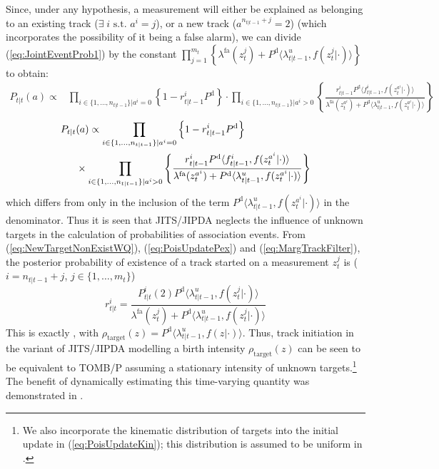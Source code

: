 \documentclass[journal,twoside]{IEEEtran}
\theoremstyle{plain}
\begin{document}
\fi
%
Since, under any hypothesis, a measurement will either be explained as belonging to an existing track ($\exists \; i \mbox{ s.t.\ } a^i=j$), or a new track ($a^{n_{t|t-1}+j}=2$) (which incorporates the possibility of it being a false alarm), we can divide (\ref{eq:JointEventProb1}) by the constant $\prod_{j=1}^{m_t}\left\{\lambda^\mathrm{fa}(z_t^j)+P^{\mathrm{d}}\langle\lambda^u_{t|t-1},f(z_t^j|\cdot)\rangle\right\}$ to obtain:
%
\ifCLASSOPTIONdraftcls
\begin{align}
P_{t|t}(a) \propto& \prod_{i\in\{1,\dots,n_{t|t-1}\}|a^i=0} \left\{ 1- r^i_{t|t-1}P^{\mathrm{d}} \right\} 
\cdot \prod_{i\in\{1,\dots,n_{t|t-1}\}|a^i>0} \left\{\frac{
r^i_{t|t-1}P^{\mathrm{d}} \langle f^i_{t|t-1},f(z_t^{a^i}|\cdot)\rangle
}{
\lambda^\mathrm{fa}(z_t^{a^i})+P^{\mathrm{d}}\langle\lambda^u_{t|t-1},f(z_t^{a^i}|\cdot)\rangle
} \right\} \label{eq:JointEventProb2}
\end{align}
\else
\begin{align}
P_{t|t}&(a) \propto \prod_{i\in\{1,\dots,n_{t|t-1}\}|a^i=0} \left\{ 1- r^i_{t|t-1}P^{\mathrm{d}} \right\} \notag\\
& \times \prod_{i\in\{1,\dots,n_{t|t-1}\}|a^i>0} \left\{\frac{
r^i_{t|t-1}P^{\mathrm{d}} \langle f^i_{t|t-1},f(z_t^{a^i}|\cdot)\rangle
}{
\lambda^\mathrm{fa}(z_t^{a^i})+P^{\mathrm{d}}\langle\lambda^u_{t|t-1},f(z_t^{a^i}|\cdot)\rangle
} \right\} \label{eq:JointEventProb2}
\end{align}
\fi
%
which differs from \cite[p179]{ChaMor11} only in the inclusion of the term $P^{\mathrm{d}}\langle\lambda^u_{t|t-1},f(z_t^{a^i}|\cdot)\rangle$ in the denominator. Thus it is seen that JITS/JIPDA neglects the influence of unknown targets in the calculation of probabilities of association events.
From (\ref{eq:NewTargetNonExistWQ}), (\ref{eq:PoisUpdatePex}) and (\ref{eq:MargTrackFilter}), the posterior probability of existence of a track started on a measurement $z_t^j$ is ($i=n_{t|t-1}+j$, $j\in\{1,\dots,m_t\}$)
%
\begin{equation}\label{eq:InitialExistenceProbability}
r^i_{t|t} = \frac{P_{t|t}^i(2)P^{\mathrm{d}}\langle\lambda^u_{t|t-1},f(z_t^j|\cdot)\rangle}{\lambda^\mathrm{fa}(z_t^j) + P^{\mathrm{d}}\langle\lambda^u_{t|t-1},f(z_t^j|\cdot)\rangle} 
\end{equation}
%
This is exactly \cite[p325, (9.13)]{ChaMor11}, with $\rho_{\textrm{target}}(z)=P^{\mathrm{d}}\langle\lambda^u_{t|t-1},f(z|\cdot)\rangle$. Thus, track initiation in the variant of JITS/JIPDA modelling a birth intensity $\rho_{\textrm{target}}(z)$ can be seen to be equivalent to TOMB/P assuming a stationary intensity of unknown targets.\footnote{We also incorporate the kinematic distribution of targets into the initial update in (\ref{eq:PoisUpdateKin}); this distribution is assumed to be uniform in \cite{ChaMor11}.} The benefit of dynamically estimating this time-varying quantity was demonstrated in \cite{Wil12F2}.
\end{document}
